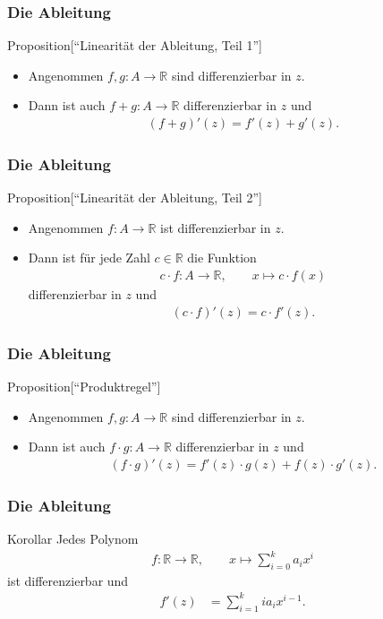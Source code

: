 \documentclass{beamer}
\newcommand\RR{\mathbb R}
\renewcommand{\ae}{\"a}
\newcommand{\ue}{\"u}
\newcommand{\mytitle}{Die Ableitung}
\begin{document}
\begin{frame}\frametitle{\mytitle}
	\begin{block}{Proposition\hfill[``Linearit\ae t  der Ableitung, Teil 1'']}
	\begin{itemize}
		\item Angenommen $f,g:A\to\RR$ sind differenzierbar in $z$.
		\item Dann ist auch $f+g:A\to\RR$ differenzierbar in $z$ und
			\begin{align*}
				(f+g)'(z)=f'(z)+g'(z).
			\end{align*}
	\end{itemize}
	\end{block}
\end{frame}

\begin{frame}\frametitle{\mytitle}
	\begin{block}{Proposition\hfill[``Linearit\ae t  der Ableitung, Teil 2'']}
	\begin{itemize}
		\item Angenommen $f:A\to\RR$ ist differenzierbar in $z$.
		\item Dann ist f\ue r jede Zahl $c\in\RR$ die Funktion
			\begin{align*}
				c\cdot f:A\to\RR,\qquad x\mapsto c\cdot f(x)
			\end{align*}
			differenzierbar in $z$ und
			\begin{align*}
				(c\cdot f)'(z)=c\cdot f'(z).
			\end{align*}
	\end{itemize}
	\end{block}
\end{frame}

\begin{frame}\frametitle{\mytitle}
	\begin{block}{Proposition\hfill[``Produktregel'']}
	\begin{itemize}
		\item Angenommen $f,g:A\to\RR$ sind differenzierbar in $z$.
		\item Dann ist auch $f\cdot g:A\to\RR$ differenzierbar in $z$ und
			\begin{align*}
				(f\cdot g)'(z)=f'(z)\cdot g(z)+f(z)\cdot g'(z).
			\end{align*}
	\end{itemize}
	\end{block}
\end{frame}

\begin{frame}\frametitle{\mytitle}
	\begin{block}{Korollar}
		Jedes Polynom
		\begin{align*}
			f:\RR\to\RR,\qquad x\mapsto \sum_{i=0}^ka_ix^i
		\end{align*}
		ist differenzierbar und
		\begin{align*}
			f'(z)&=\sum_{i=1}^k ia_ix^{i-1}.
		\end{align*}
	\end{block}
\end{frame}
\end{document}
